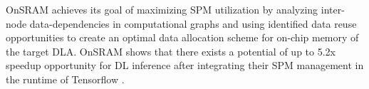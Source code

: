 

OnSRAM achieves its goal of maximizing SPM utilization by analyzing inter-node
data-dependencies in computational graphs and using identified data reuse
opportunities to create an optimal data allocation scheme for on-chip memory of
the target DLA. OnSRAM shows that there exists a potential of up to 5.2x
speedup opportunity for DL inference after integrating their SPM management in
the runtime of Tensorflow \cite{onsram}.







